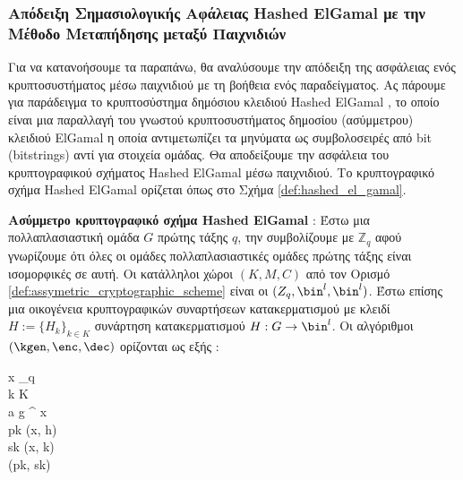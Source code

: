 \subsubsection{Απόδειξη Σημασιολογικής Αφάλειας Hashed ElGamal με την Μέθοδο Μεταπήδησης μεταξύ Παιχνιδιών}

Για να κατανοήσουμε τα παραπάνω, θα αναλύσουμε την απόδειξη της ασφάλειας ενός κρυπτοσυστήματος μέσω παιχνιδιού με τη βοήθεια ενός παραδείγματος. Ας πάρουμε για παράδειγμα το κρυπτοσύστημα δημόσιου κλειδιού Hashed ElGamal \cite{cryptoeprint:2004/332}, το οποίο είναι μια παραλλαγή του γνωστού κρυπτοσυστήματος δημοσίου (ασύμμετρου) κλειδιού ElGamal η οποία αντιμετωπίζει τα μηνύματα ως συμβολοσειρές από bit (bitstrings) αντί για στοιχεία ομάδας. Θα αποδείξουμε την ασφάλεια του κρυπτογραφικού σχήματος Hashed ElGamal μέσω παιχνιδιού. Το κρυπτογραφικό σχήμα Hashed ElGamal ορίζεται όπως στο Σχήμα \ref{def:hashed_el_gamal}.

\begin{definition}
    \label{def:hashed_el_gamal}
    \textbf{Ασύμμετρο κρυπτογραφικό σχήμα Hashed ElGamal} : Έστω μια πολλαπλασιαστική ομάδα $G$ πρώτης τάξης $q$, την συμβολίζουμε με $\mathbb{Z}_q$ αφού γνωρίζουμε ότι όλες οι ομάδες πολλαπλασιαστικές ομάδες πρώτης τάξης είναι ισομορφικές σε αυτή. Οι κατάλληλοι χώροι $(K, M, C)$ από τον Ορισμό \ref{def:assymetric_cryptographic_scheme} είναι οι $(Z_q, \bin^l, \bin^l)$. Έστω επίσης μια οικογένεια κρυπτογραφικών συναρτήσεων κατακερματισμού με κλειδί $H := \{H_k\}_{k \in K}$ συνάρτηση κατακερματισμού $H : G \rightarrow \bin^l$. Οι αλγόριθμοι $(\kgen, \enc, \dec)$ ορίζονται ως εξής :
    \begin{pchstack}[center, boxed, space=1em]
        \procedure[linenumbering]{\kgen(\secparam)} {
        x \sample {}_q \\
        k \sample K \\
        a \leftarrow g ^ x \\
        pk \leftarrow (x, h) \\
        sk \leftarrow (x, k) \\
        \pcreturn (pk, sk)
        }
    \end{pchstack}
\end{definition}

